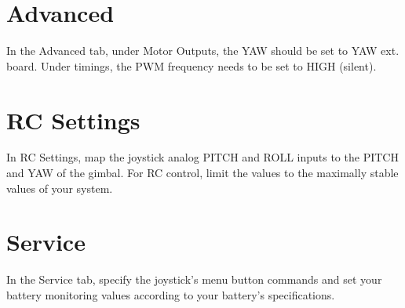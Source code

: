 \section{Advanced}
In the Advanced tab, under Motor Outputs, the YAW should be set to YAW ext. board. Under timings, the PWM frequency needs to be set to HIGH (silent).

\section{RC Settings}
In RC Settings, map the joystick analog PITCH and ROLL inputs to the PITCH and YAW of the gimbal. For RC control, limit the values to the maximally stable values of your system.

\section{Service}
In the Service tab, specify the joystick’s menu button commands and set your battery monitoring values according to your battery’s specifications.

